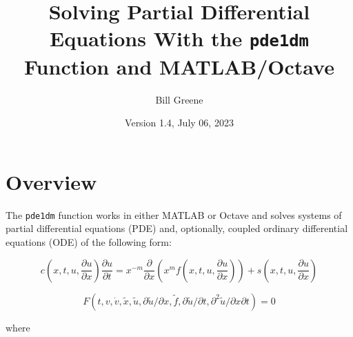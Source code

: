 \documentclass{article}
\begin{document}
\newcommand{\pde}{ {\tt pde1dm} }
\newcommand{\ml}{ {\tt MATLAB} }
\newcommand{\pdepe}{ {\tt pdepe} }
\newcommand{\exdir}{c:/wgreene/scripts/matlab/pde1dM/documents/}
\newcommand{\mylisting}[1]{}
\newcommand{\pux}{\frac{\partial u}{\partial x}}
\newcommand{\mycode}[1]{{\tt #1}}


\title{Solving Partial Differential Equations With the \pde Function and MATLAB/Octave}
\author{Bill Greene}
\date{Version 1.4, July 06, 2023}
\maketitle

\tableofcontents
\newpage

\section{Overview}
The \pde function works in either MATLAB or Octave and solves systems of partial differential equations (PDE) and, optionally,
coupled ordinary differential equations (ODE) of the following form:

\begin{equation}\label{eq:pde}
c(x, t,u,\pux{})\frac{\partial u}{\partial t} = x^{-m} \frac{\partial}{\partial x}
\left(x^m f(x, t,u,\pux )\right) +  s(x, t,u,\pux ) 
\end{equation}

\begin{equation}\label{eq:ode}
F(t,v,\dot v,\tilde x, \tilde u, \partial \tilde u/\partial x, \tilde f,  \partial\tilde u/\partial t,  \partial^2\tilde u/\partial x\partial t) = 0
\end{equation}

where
\end{document}
